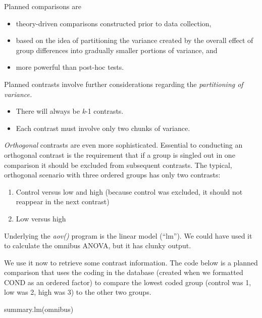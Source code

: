 \documentclass[
  11pt,
]{book}
\newenvironment{Shaded}{\begin{snugshade}}{\end{snugshade}}
\newcommand{\FunctionTok}[1]{\textcolor[rgb]{0.00,0.00,0.00}{#1}}
\newcommand{\NormalTok}[1]{#1}
\providecommand{\tightlist}{%
  \setlength{\itemsep}{0pt}\setlength{\parskip}{0pt}}
\begin{document}
Planned comparisons are

\begin{itemize}
\tightlist
\item
  theory-driven comparisons constructed prior to data collection,
\item
  based on the idea of partitioning the variance created by the overall effect of group differences into gradually smaller portions of variance, and
\item
  more powerful than post-hoc tests.
\end{itemize}

Planned contrasts involve further considerations regarding the \emph{partitioning of variance.}

\begin{itemize}
\tightlist
\item
  There will always be \emph{k}-1 contrasts.
\item
  Each contrast must involve only two chunks of variance.
\end{itemize}

\emph{Orthogonal} contrasts are even more sophisticated. Essential to conducting an orthogonal contrast is the requirement that if a group is singled out in one comparison it should be excluded from subsequent contrasts. The typical, orthogonal scenario with three ordered groups has only two contrasts:

\begin{enumerate}
\def\labelenumi{\arabic{enumi}.}
\tightlist
\item
  Control versus low and high (because control was excluded, it should not reappear in the next contrast)
\item
  Low versus high
\end{enumerate}

Underlying the \emph{aov()} program is the linear model (``lm''). We could have used it to calculate the omnibus ANOVA, but it has clunky output.

We use it now to retrieve some contrast information. The code below is a planned comparison that uses the coding in the database (created when we formatted COND as an ordered factor) to compare the lowest coded group (control was 1, low was 2, high was 3) to the other two groups.

\begin{Shaded}
\begin{Highlighting}[]
\FunctionTok{summary.lm}\NormalTok{(omnibus)}
\end{Highlighting}
\end{Shaded}
\end{document}
